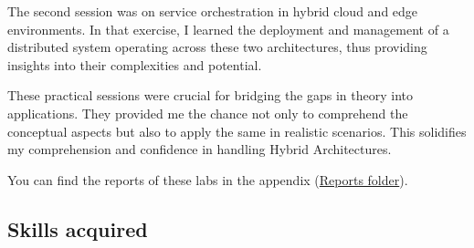\noindent The second session was on service orchestration in hybrid cloud and edge environments. In that exercise, I learned the deployment and management of a distributed system operating across these two architectures, thus providing insights into their complexities and potential.
\vspace{0.25cm}

\noindent These practical sessions were crucial for bridging the gaps in theory into applications. They provided me the chance not only to comprehend the conceptual aspects but also to apply the same in realistic scenarios. This solidifies my comprehension and confidence in handling Hybrid Architectures.
\vspace{0.25cm}

\noindent You can find the reports of these labs in the appendix (\href{https://github.com/Raspeur/Portfolio/tree/main/Reports}{Reports folder}).

\subsection{Skills acquired}

